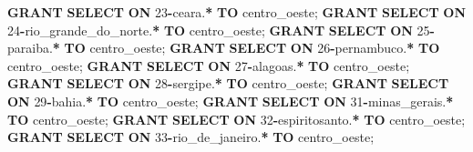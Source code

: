 \documentclass[
]{book}
\newenvironment{Shaded}{\begin{snugshade}}{\end{snugshade}}
\newcommand{\DecValTok}[1]{\textcolor[rgb]{0.00,0.00,0.81}{#1}}
\newcommand{\KeywordTok}[1]{\textcolor[rgb]{0.13,0.29,0.53}{\textbf{#1}}}
\newcommand{\NormalTok}[1]{#1}
\newcommand{\OperatorTok}[1]{\textcolor[rgb]{0.81,0.36,0.00}{\textbf{#1}}}
\newcommand{\StringTok}[1]{\textcolor[rgb]{0.31,0.60,0.02}{#1}}
\begin{document}
\begin{Shaded}
\begin{Highlighting}[]
\KeywordTok{GRANT} \KeywordTok{SELECT} \KeywordTok{ON}\NormalTok{ \textasciigrave{}}\DecValTok{23}\OperatorTok{{-}}\NormalTok{ceara\textasciigrave{}.}\OperatorTok{*}              \KeywordTok{TO} \StringTok{\textquotesingle{}centro\_oeste\textquotesingle{}}\NormalTok{;}
\KeywordTok{GRANT} \KeywordTok{SELECT} \KeywordTok{ON}\NormalTok{ \textasciigrave{}}\DecValTok{24}\OperatorTok{{-}}\NormalTok{rio\_grande\_do\_norte\textasciigrave{}.}\OperatorTok{*} \KeywordTok{TO} \StringTok{\textquotesingle{}centro\_oeste\textquotesingle{}}\NormalTok{;}
\KeywordTok{GRANT} \KeywordTok{SELECT} \KeywordTok{ON}\NormalTok{ \textasciigrave{}}\DecValTok{25}\OperatorTok{{-}}\NormalTok{paraiba\textasciigrave{}.}\OperatorTok{*}            \KeywordTok{TO} \StringTok{\textquotesingle{}centro\_oeste\textquotesingle{}}\NormalTok{;}
\KeywordTok{GRANT} \KeywordTok{SELECT} \KeywordTok{ON}\NormalTok{ \textasciigrave{}}\DecValTok{26}\OperatorTok{{-}}\NormalTok{pernambuco\textasciigrave{}.}\OperatorTok{*}         \KeywordTok{TO} \StringTok{\textquotesingle{}centro\_oeste\textquotesingle{}}\NormalTok{;}
\KeywordTok{GRANT} \KeywordTok{SELECT} \KeywordTok{ON}\NormalTok{ \textasciigrave{}}\DecValTok{27}\OperatorTok{{-}}\NormalTok{alagoas\textasciigrave{}.}\OperatorTok{*}            \KeywordTok{TO} \StringTok{\textquotesingle{}centro\_oeste\textquotesingle{}}\NormalTok{;}
\KeywordTok{GRANT} \KeywordTok{SELECT} \KeywordTok{ON}\NormalTok{ \textasciigrave{}}\DecValTok{28}\OperatorTok{{-}}\NormalTok{sergipe\textasciigrave{}.}\OperatorTok{*}            \KeywordTok{TO} \StringTok{\textquotesingle{}centro\_oeste\textquotesingle{}}\NormalTok{;}
\KeywordTok{GRANT} \KeywordTok{SELECT} \KeywordTok{ON}\NormalTok{ \textasciigrave{}}\DecValTok{29}\OperatorTok{{-}}\NormalTok{bahia\textasciigrave{}.}\OperatorTok{*}              \KeywordTok{TO} \StringTok{\textquotesingle{}centro\_oeste\textquotesingle{}}\NormalTok{;}
\KeywordTok{GRANT} \KeywordTok{SELECT} \KeywordTok{ON}\NormalTok{ \textasciigrave{}}\DecValTok{31}\OperatorTok{{-}}\NormalTok{minas\_gerais\textasciigrave{}.}\OperatorTok{*}       \KeywordTok{TO} \StringTok{\textquotesingle{}centro\_oeste\textquotesingle{}}\NormalTok{;}
\KeywordTok{GRANT} \KeywordTok{SELECT} \KeywordTok{ON}\NormalTok{ \textasciigrave{}}\DecValTok{32}\OperatorTok{{-}}\NormalTok{espiritosanto\textasciigrave{}.}\OperatorTok{*}      \KeywordTok{TO} \StringTok{\textquotesingle{}centro\_oeste\textquotesingle{}}\NormalTok{;}
\KeywordTok{GRANT} \KeywordTok{SELECT} \KeywordTok{ON}\NormalTok{ \textasciigrave{}}\DecValTok{33}\OperatorTok{{-}}\NormalTok{rio\_de\_janeiro\textasciigrave{}.}\OperatorTok{*}     \KeywordTok{TO} \StringTok{\textquotesingle{}centro\_oeste\textquotesingle{}}\NormalTok{;}

\end{Highlighting}
\end{Shaded}
\end{document}
